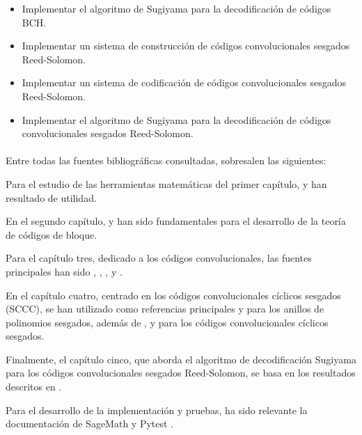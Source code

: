 \begin{itemize}
    \item Implementar el algoritmo de Sugiyama para la decodificación de códigos BCH.
    \item Implementar un sistema de construcción de códigos convolucionales sesgados Reed-Solomon.
    \item Implementar un sistema de codificación de códigos convolucionales sesgados Reed-Solomon.
    \item Implementar el algoritmo de Sugiyama para la decodificación de códigos convolucionales sesgados Reed-Solomon.
\end{itemize}

\paragraph{}
\phantom{}

Entre todas las fuentes bibliográficas consultadas, sobresalen las siguientes:

Para el estudio de las herramientas matemáticas del primer capítulo, \cite{knapp2006basic} y \cite{Huffman_Pless_2010} han resultado de utilidad.

En el segundo capítulo, \cite{Huffman_Pless_2010} y \cite{betten2006error} han sido fundamentales para el desarrollo de la teoría de códigos de bloque.

Para el capítulo tres, dedicado a los códigos convolucionales, las fuentes principales han sido \cite{Huffman_Pless_2010}, \cite{Forney1970}, \cite{Johannesson2015}, \cite{cccheide} y \cite{jl2020}.

En el capítulo cuatro, centrado en los códigos convolucionales cíclicos sesgados (SCCC), se han utilizado como referencias principales \cite{gluesingluerssen2019skewpolynomial} y \cite{jacobson1996} para los anillos de polinomios sesgados, además de \cite{cccheide}, \cite{SCCC} y \cite{gomez2017sugiyama} para los códigos convolucionales cíclicos sesgados.

Finalmente, el capítulo cinco, que aborda el algoritmo de decodificación Sugiyama para los códigos convolucionales sesgados Reed-Solomon, se basa en los resultados descritos en \cite{gomez2017sugiyama}. 

Para el desarrollo de la implementación y pruebas, ha sido relevante la documentación de SageMath \cite{SageMath2022} y Pytest \cite{pytest7.4.0}.






\endinput

